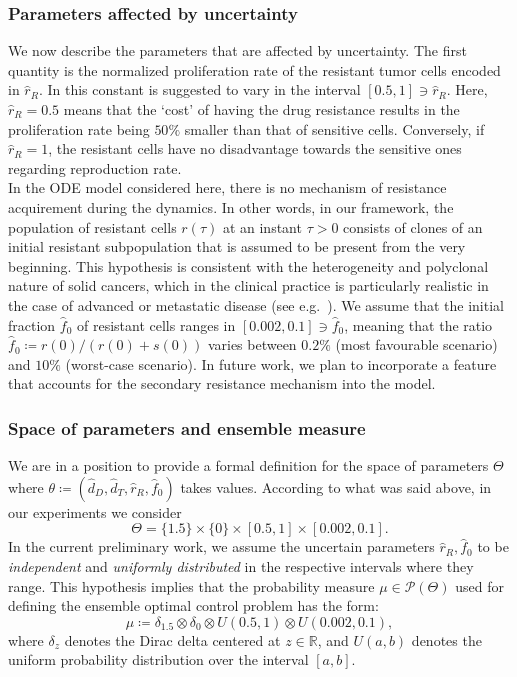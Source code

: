 \documentclass[a4paper,12pt, reqno]{amsart}
\theoremstyle{plain}
\theoremstyle{definition}
\theoremstyle{remark}
\numberwithin{equation}{section}
\newcommand{\R}{\mathbb{R}}
\begin{document}
\subsubsection*{Parameters affected by uncertainty}
We now describe the parameters that are affected by uncertainty.
The first quantity is the normalized proliferation rate of the resistant tumor cells encoded in $\hat r_R$. In \cite{turnover2021} this constant is suggested to vary in the interval $[0.5,1]\ni \hat r_R$. Here, $\hat r_R= 0.5$ means that the `cost' of having the drug resistance results in the proliferation rate being $50\%$ smaller than that of sensitive cells. Conversely, if $\hat r_R= 1$, the resistant cells have no disadvantage towards the sensitive ones regarding reproduction rate. \\
In the ODE model considered here, there is no mechanism of resistance acquirement during the {dynamics}. In other words, in our framework, the population of resistant cells $r(\tau)$ at an instant $\tau>0$ consists of clones of an initial resistant subpopulation that is assumed to be present from the very beginning.
This hypothesis is consistent with the heterogeneity and polyclonal nature of solid cancers, which in the clinical practice is particularly realistic in the case of advanced or metastatic disease (see e.g.~\cite{swanton2012heterogeneity}).
We assume that the initial fraction $\hat f_0$ of resistant cells ranges in $[0.002,0.1]\ni \hat f_0$, meaning that the ratio $\hat f_0\coloneqq r(0)/(r(0)+s(0))$ varies between $0.2\%$ (most favourable scenario) and $10\%$ (worst-case scenario).
In future work, we plan to incorporate a feature that accounts for the secondary resistance mechanism into the model.


\subsubsection*{Space of parameters and ensemble measure} We are in a position to provide a formal definition for the space of parameters $\Theta$ where $\theta\coloneqq (\hat d_D, \hat d_T, \hat r_R, \hat f_0)$ takes values.
According to what was said above, in our experiments we consider
\begin{equation*}
    \Theta = \{1.5\} \times \{0\} \times [0.5,1] \times [0.002,0.1].
\end{equation*}
In the current preliminary work, we assume the uncertain parameters $\hat r_R, \hat f_0$ to be \emph{independent} and \emph{uniformly distributed} in the respective intervals where they range.
This hypothesis implies that the probability measure $\mu\in \mathcal{P}(\Theta)$ used for defining the ensemble optimal control problem has the form:
\begin{equation} \label{eq:mu_simul}
    \mu \coloneqq \delta_{1.5} \otimes \delta_0 \otimes U(0.5,1) \otimes U(0.002,0.1),
\end{equation}
where $\delta_{z}$ denotes the Dirac delta centered at $z\in\R$, and $U(a,b)$ denotes the uniform probability distribution over the interval $[a,b]$.
\end{document}
